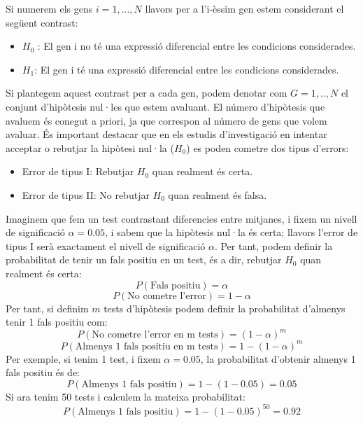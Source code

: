 \documentclass[english]{article}
\begin{document}
Si numerem els gens $i = 1,...,N$ llavors per a l'i-èssim gen estem considerant el següent contrast:
\begin{itemize}
\item $H_{0}$ : El gen i no té una expressió diferencial entre les condicions considerades.
\item $H_{1}$: El gen i té una expressió diferencial entre les condicions considerades.
\end{itemize}
Si plantegem aquest contrast per a cada gen, podem denotar com $G={1,..,N}$ el conjunt d'hipòtesis nul·les que estem avaluant. El número d'hipòtesis que avaluem és conegut a priori, ja que correspon al número de gens que volem avaluar. És important destacar que en els estudis d'investigació en intentar acceptar o rebutjar la hipòtesi nul·la ($H_{0}$) es poden cometre dos tipus d'errors:
\begin{itemize}
\item Error de tipus I: Rebutjar $H_{0}$ quan realment és certa.
\item Error de tipus II: No rebutjar $H_{0}$ quan realment és falsa.
\end{itemize}
Imaginem que fem un test contrastant diferencies entre mitjanes, i fixem un nivell de significació $\alpha=0.05$, i sabem que la hipòtesis nul·la és certa; llavors l'error de tipus I serà exactament el nivell de significació $\alpha$. Per tant, podem definir la probabilitat de tenir un fals positiu en un test, és a dir, rebutjar $H_{0}$ quan realment és certa:
\begin{equation*}
P(\text{Fals positiu}) = \alpha
\end{equation*}
\begin{equation*}
P(\text{No cometre l'error}) = 1 - \alpha
\end{equation*}
Per tant, si definim $m$ tests d'hipòtesis podem definir la probabilitat d'almenys tenir 1 fals positiu com:
\begin{equation*}
P(\text{No cometre l'error en m tests}) = (1 - \alpha)^m
\end{equation*}
\begin{equation*}
P(\text{Almenys 1 fals positiu en m tests}) = 1 - (1 - \alpha)^m
\end{equation*}
Per exemple, si tenim 1 test, i fixem $\alpha=0.05$, la probabilitat d'obtenir almenys 1 fals positiu és de:
\begin{equation*}
P(\text{Almenys 1 fals positiu}) = 1-(1-0.05)= 0.05
\end{equation*}
Si ara tenim 50 tests i calculem la mateixa probabilitat:
\begin{equation*}
P(\text{Almenys 1 fals positiu}) = 1-(1-0.05)^{50}= 0.92
\end{equation*}
\end{document}
